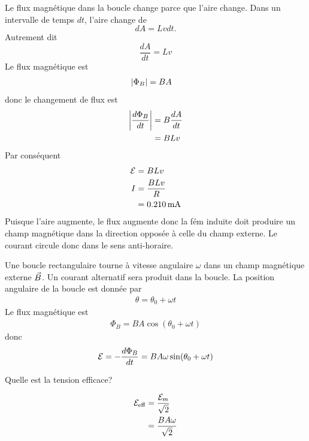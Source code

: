 \begin{reponsebox}
Le flux magnétique dans la boucle change parce que l'aire change. Dans un
intervalle de temps $dt$, l'aire change de
$$dA = Lvdt.$$
Autrement dit
$$\frac{dA}{dt} = Lv$$
Le flux magnétique est
\begin{align*}
  \left| \Phi_B \right| &= BA
\end{align*}
donc le changement de flux est 
\begin{align*}
  \left| \frac{d\Phi_B}{dt} \right| &= B \frac{dA}{dt} \\
      &= BLv
\end{align*}
Par conséquent
\begin{align*}
  \mathcal{E} &= BLv \\
  I &= \frac{BLv}{R} \\
    &= \SI{0.210}{mA}
\end{align*}
Puisque l'aire augmente, le flux augmente donc la fém induite doit produire un
champ magnétique dans la direction opposée à celle du champ externe. Le courant
circule donc dans le sens anti-horaire.
\end{reponsebox}



Une boucle rectangulaire tourne à vitesse angulaire $\omega$ dans un champ
magnétique externe $\vec{B}$. Un courant alternatif sera produit dans la boucle.
La position angulaire de la boucle est donnée par
\begin{align*}
  \theta = \theta_0 + \omega t
\end{align*}
Le flux magnétique est
\begin{align*}
  \Phi_B = BA \cos(\theta_0 + \omega t)
\end{align*}
donc
\begin{align*}
  \mathcal{E} = -\frac{d\Phi_B}{dt} = BA\omega \sin(\theta_0 + \omega t)
\end{align*}

Quelle est la tension efficace?

\begin{align*}
  \mathcal{E}_\mathrm{eff} &= \frac{\mathcal{E}_m}{\sqrt{2}} \\
                    &= \frac{BA\omega}{\sqrt{2}} 
\end{align*}

